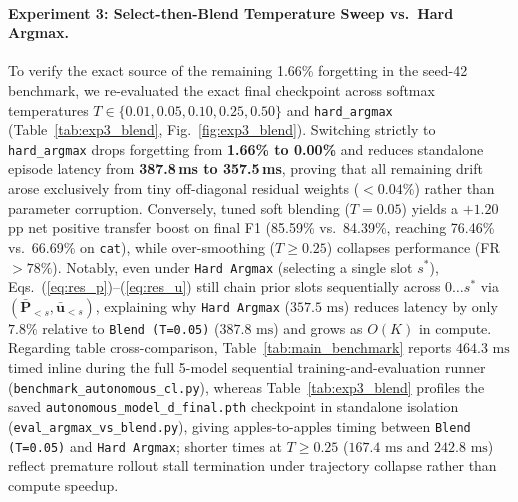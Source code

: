 \documentclass[10pt,twocolumn]{article}
\begin{document}
\paragraph{Experiment 3: Select-then-Blend Temperature Sweep vs.\ Hard Argmax.}
To verify the exact source of the remaining 1.66\% forgetting in the seed-42 benchmark, we re-evaluated the exact final checkpoint across softmax temperatures $T \in \{0.01, 0.05, 0.10, 0.25, 0.50\}$ and \texttt{hard\_argmax} (Table~\ref{tab:exp3_blend}, Fig.~\ref{fig:exp3_blend}). Switching strictly to \texttt{hard\_argmax} drops forgetting from \textbf{1.66\% to 0.00\%} and reduces standalone episode latency from \textbf{387.8\,ms to 357.5\,ms}, proving that all remaining drift arose exclusively from tiny off-diagonal residual weights ($<0.04\%$) rather than parameter corruption. Conversely, tuned soft blending ($T=0.05$) yields a $+1.20$\,pp net positive transfer boost on final F1 (85.59\% vs.\ 84.39\%, reaching 76.46\% vs.\ 66.69\% on \texttt{cat}), while over-smoothing ($T \ge 0.25$) collapses performance (FR $>78\%$). Notably, even under \texttt{Hard Argmax} (selecting a single slot $s^*$), Eqs.~(\ref{eq:res_p})--(\ref{eq:res_u}) still chain prior slots sequentially across $0 \dots s^*$ via $(\bar{\mathbf{P}}_{<s}, \bar{\mathbf{u}}_{<s})$, explaining why \texttt{Hard Argmax} ($357.5\text{ ms}$) reduces latency by only $7.8\%$ relative to \texttt{Blend (T=0.05)} ($387.8\text{ ms}$) and grows as $O(K)$ in compute. Regarding table cross-comparison, Table~\ref{tab:main_benchmark} reports $464.3\text{ ms}$ timed inline during the full 5-model sequential training-and-evaluation runner (\texttt{benchmark\_autonomous\_cl.py}), whereas Table~\ref{tab:exp3_blend} profiles the saved \texttt{autonomous\_model\_d\_final.pth} checkpoint in standalone isolation (\texttt{eval\_argmax\_vs\_blend.py}), giving apples-to-apples timing between \texttt{Blend (T=0.05)} and \texttt{Hard Argmax}; shorter times at $T \ge 0.25$ ($167.4\text{ ms}$ and $242.8\text{ ms}$) reflect premature rollout stall termination under trajectory collapse rather than compute speedup.
\end{document}
